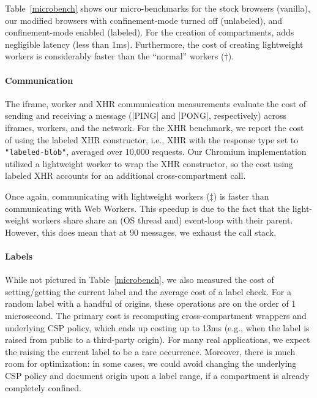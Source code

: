 Table~\ref{microbench} shows our micro-benchmarks for the stock
browsers (vanilla), our modified browsers with confinement-mode turned
off (unlabeled), and confinement-mode enabled (labeled).
%
For the creation of compartments, \sys{} adds negligible latency (less
than 1ms).
%
Furthermore, the cost of creating lightweight workers is considerably
faster than the ``normal'' workers ($\dagger$).

\paragraph{Communication} The iframe, worker and XHR communication measurements evaluate the
cost of sending and receiving a message (\js|PING| and \js|PONG|,
respectively) across iframes, workers, and the network.
%
For the XHR benchmark, we report the cost of using the labeled XHR
constructor, i.e., XHR with the response type set to
\verb|"labeled-blob"|, averaged over 10,000 requests.
%
Our Chromium implementation utilized a lightweight worker to wrap the XHR
constructor, so the cost using labeled XHR accounts for an additional
cross-compartment call.

Once again, communicating with lightweight workers ($\ddagger$)
is
faster than communicating with Web Workers.
%
This speedup is due to the fact that the light-weight workers share
share an (OS thread and) event-loop with their parent.
%
However, this does mean that at 90 messages, we exhaust the call
stack.


\paragraph{Labels} While not pictured in Table~\ref{microbench},
we also measured the cost of setting/getting the current label and the
average cost of a label check.
%
For a random label with a handful of origins, these operations are on
the order of 1 microsecond.
%
The primary cost is recomputing cross-compartment wrappers and
underlying CSP policy, which ends up costing up to 13ms (e.g., when
the label is raised from public to a third-party origin).
%
For many real applications, we expect the raising the current label
to be a rare occurrence.
%
Moreover, there is much room for optimization: in some cases,
we could avoid changing the underlying CSP policy and document
origin upon a label range, if a compartment is already completely confined.
 
